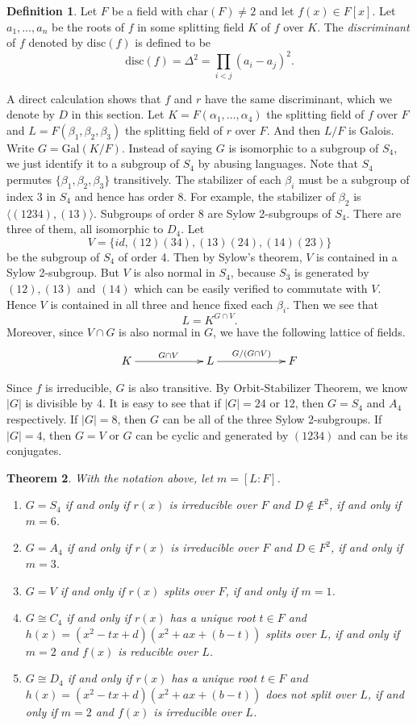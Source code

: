 \documentclass[12pt]{report}
\newtheorem{theorem}{Theorem}[section]
\theoremstyle{definition}
\newtheorem{definition}[theorem]{Definition}
\newcommand{\gal}{\text{Gal}}
\newcommand{\ta}[1]{\langle #1 \rangle}
\newcommand{\charr}{\text{char}}
\newcommand{\disc}[1]{\mbox{disc}(#1)}
\begin{document}
\begin{definition}
	Let $F$ be a field with $\charr{(F)}\not=2$ and let $f(x)\in F[x]$. Let $a_1,\dots,a_n$ be the roots of $f$ in some splitting field $K$ of $f$ over $K$. The \emph{discriminant} of $f$ denoted by $\disc{f}$ is defined to be $$\disc{f}=\Delta^2 = \prod_{i<j}(a_i-a_j)^2.$$
\end{definition}

A direct calculation shows that $f$ and $r$ have the same discriminant, which we denote by $D$ in this section. Let $K=F(\alpha_1,\dots,\alpha_4)$ the splitting field of $f$ over $F$ and $L=F(\beta_1,\beta_2,\beta_3)$ the splitting field of $r$ over $F$. And then $L/F$ is Galois. Write $G=\gal(K/F)$. Instead of saying $G$ is isomorphic to a subgroup of $S_4$, we just identify it to a subgroup of $S_4$ by abusing languages. Note that $S_4$ permutes $\{\beta_1,\beta_2,\beta_3\}$ transitively. The stabilizer of each $\beta_i$ must be a subgroup of index $3$ in $S_4$ and hence has order $8$. For example, the stabilizer of $\beta_2$ is $\ta{(1234),(13)}$. Subgroups of order 8 are Sylow 2-subgroups of $S_4$. There are three of them, all isomorphic to $D_4$. Let \[V=\{id,(12)(34),(13)(24),(14)(23)\}\] be the subgroup of $S_4$ of order 4. Then by Sylow's theorem, $V$ is contained in a Sylow 2-subgroup. But $V$ is also normal in $S_4$, because $S_3$ is generated by $(12),(13)$ and $(14)$ which can be easily verified to commutate with $V$. Hence $V$ is contained in all three and hence fixed each $\beta_i$. Then we see that $$L= K^{G\cap V}.$$
Moreover, since $V\cap G$ is also normal in $G$, we have the following lattice of fields. $$\xymatrixcolsep{5pc}\xymatrix{
		K\ar[r]^{G\cap V} & L\ar[r]^{G/(G\cap V)} & F}
$$

Since $f$ is irreducible, $G$ is also transitive. By Orbit-Stabilizer Theorem, we know $|G|$ is divisible by 4. It is easy to see that if $|G|=24$ or 12, then $G=S_4$ and $A_4$ respectively. If $|G|=8$, then $G$ can be all of the three Sylow 2-subgroups. If $|G|=4$, then $G=V$ or $G$ can be cyclic and generated by $(1234)$ and can be its conjugates.


\begin{theorem}
	With the notation above, let $m=[L:F]$.
	\begin{enumerate}
		\item $G=S_4$ if and only if $r(x)$ is irreducible over $F$ and $D\notin F^2$, if and only if $m=6$.
		\item $G=A_4$ if and only if $r(x)$ is irreducible over $F$ and $D\in F^2$, if and only if $m=3$.
		\item $G=V$ if and only if $r(x)$ splits over $F$, if and only if $m=1$.
		\item $G\cong C_4$ if and only if $r(x)$ has a unique root $t\in F$ and $h(x)=(x^2-tx+d)(x^2+ax+(b-t))$ splits over $L$, if and only if $m=2$ and $f(x)$ is reducible over $L$.
		\item $G\cong D_4$ if and only if $r(x)$ has a unique root $t\in F$ and $h(x)=(x^2-tx+d)(x^2+ax+(b-t))$ does not split over $L$, if and only if $m=2$ and $f(x)$ is irreducible over $L$.
	\end{enumerate}
\end{theorem}
\end{document}
